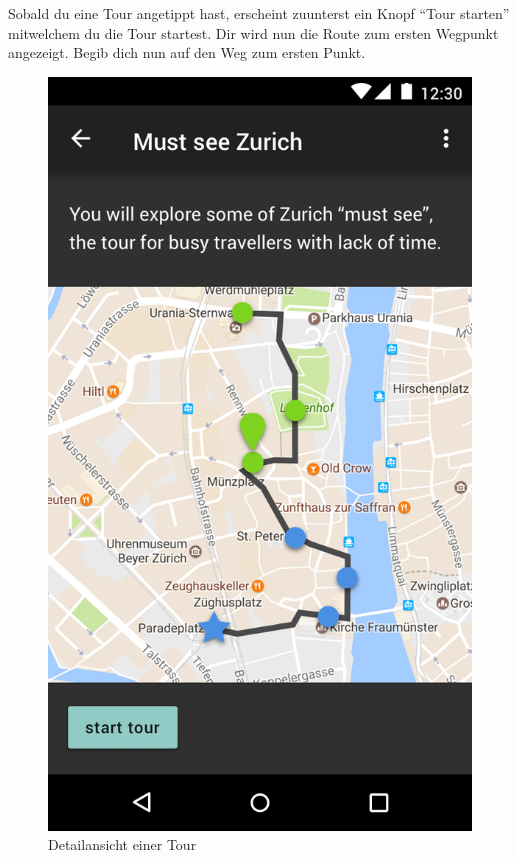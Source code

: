 \documentclass[a4paper,10pt,xetex]{article}
\begin{document}
Sobald du eine Tour angetippt hast, erscheint zuunterst ein Knopf ``Tour starten''
mitwelchem du die Tour startest. Dir wird nun die Route zum ersten Wegpunkt angezeigt.
Begib dich nun auf den Weg zum ersten Punkt.

\begin{figure}
  \centering
  \begin{minipage}[b]{0.48\textwidth}
    \includegraphics[width=\textwidth]{DetailActivity}
    \caption{Detailansicht einer Tour}
  \end{minipage}

\end{figure}
\end{document}
